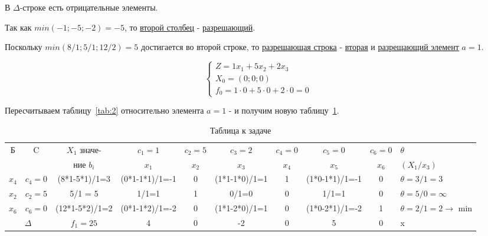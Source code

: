 В $\Delta$-строке есть отрицательные элементы.

Так как $min(-1; -5; -2) = -5$, то \underline{второй столбец} - \underline{разрешающий}.

Поскольку $min(8/1; 5/1; 12/2) = 5$ достигается во второй строке, то \underline{разрешающая строка} -  \underline{вторая}
и \underline{разрещающий элемент} $a=1$.

\begin{equation*}
  \begin{cases}
    Z = 1 x_1 + 5 x_2 + 2 x_3\\
    X_0 = (0;0;0)\\
    f_0 = 1 \cdot 0 + 5 \cdot 0 + 2 \cdot 0 = 0
  \end{cases}
\end{equation*}

Пересчитываем таблицу~\ref{tab:2} относительно элемента $a=1$ - и получим новую таблицу~\ref{tab:3}.

\begin{table}[h!]
  \scriptsize

  \centering

  \caption{Таблица к задаче}
  \label{tab:3}

  \begin{tabular}{|c|c|c|c|c|||c|||c|c|c|l|} 
    \hline
    Б &C                      &$X_1$ значе-   &$c_1=1$        &$c_2=5$  &$c_3=2$        &$c_4=0$  &$c_5=0$        &$c_6=0$  &$\theta$\\
          &                       &ние $b_i$      &$x_1$          &$x_2$    &$x_3$          &$x_4$    &$x_5$          &$x_6$    &$(X_1/x_3)$\\ \hline
    $x_4$ &$c_4=0$                &(8*1-5*1)/1=3  &(0*1-1*1)/1=-1 &0        &(1*1-1*0)/1=1  &1        &(1*0-1*1)/1=-1 &0        &$\theta = 3/1=3$ \\ \hline
    $x_2$ &$c_2=5$                &5/1 = 5        &1/1=1          &1        &0/1=0          &0        &1/1=1          &0        &$\theta = 5/0=\infty$ \\ \hline\hline\hline
    $x_6$ &$c_6=0$                &(12*1-5*2)/1=2 &(0*1-1*2)/1=-2 &0        &(1*1-2*0)/1=1 &0        &(1*0-2*1)/1=-2 &1        &$\theta = 2/1=2 \to$ min \\ \hline\hline\hline
    \multicolumn{2}{|c|}{$\Delta$}&$f_1=25$       &4              &0        &-2             &0        &5              &0        & x \\\hline
  \end{tabular}
\end{table}

